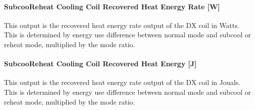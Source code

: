 \paragraph{SubcooReheat Cooling Coil Recovered Heat Energy Rate {[}W{]}}\label{subcooreheat-cooling-coil-recovered-heat-energy-rate-w}

This output is the recovered heat energy rate output of the DX coil in Watts. This is determined by energy use difference between normal mode and subcool or reheat mode, multiplied by the mode ratio.

\paragraph{SubcooReheat Cooling Coil Recovered Heat Energy {[}J{]}}\label{subcooreheat-cooling-coil-recovered-heat-energy-j}

This output is the recovered heat energy rate output of the DX coil in Jouals. This is determined by energy use difference between normal mode and subcool or reheat mode, multiplied by the mode ratio.

